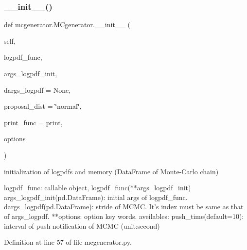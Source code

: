 \subsubsection{\texorpdfstring{\+\_\+\+\_\+init\+\_\+\+\_\+()}{\_\_init\_\_()}}
{\footnotesize\ttfamily def mcgenerator.\+M\+Cgenerator.\+\_\+\+\_\+init\+\_\+\+\_\+ (\begin{DoxyParamCaption}\item[{}]{self,  }\item[{}]{logpdf\+\_\+func,  }\item[{}]{args\+\_\+logpdf\+\_\+init,  }\item[{}]{dargs\+\_\+logpdf = {\ttfamily None},  }\item[{}]{proposal\+\_\+dist = {\ttfamily \char`\"{}normal\char`\"{}},  }\item[{}]{print\+\_\+func = {\ttfamily print},  }\item[{}]{options }\end{DoxyParamCaption})}

\begin{DoxyVerb}initialization of logpdfs and memory (DataFrame of Monte-Carlo chain)

logpdf_func: callable object, logpdf_func(**args_logpdf_init)
args_logpdf_init(pd.DataFrame): initial args of logpdf_func.
dargs_logpdf(pd.DataFrame): stride of MCMC. It's index must be same as that of args_logpdf.
**options: option key words. aveilables:
    push_time(default=10): interval of push notification of MCMC (unit:second)
\end{DoxyVerb}
 

Definition at line 57 of file mcgenerator.\+py.


